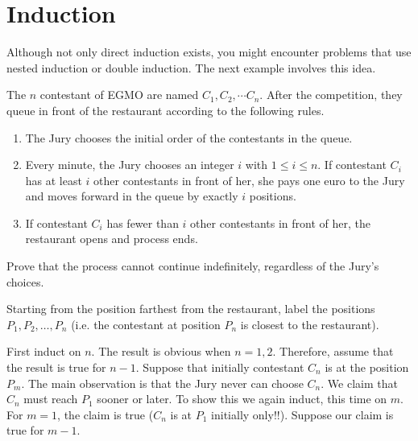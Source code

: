 \begin{example}

\end{example}

\section{Induction}

\begin{example}

\end{example}

Although not only direct induction exists, you might encounter problems that use nested induction or double induction. The next example involves this idea.

\begin{example}[EGMO 2018]
    The $n$ contestant of EGMO are named $C_1, C_2, \cdots C_n$. After the competition, they queue in front of the restaurant according to the following rules.
    \begin{enumerate}
        \item The Jury chooses the initial order of the contestants in the queue.
        \item Every minute, the Jury chooses an integer $i$ with $1 \leq i \leq n$.
        If contestant $C_i$ has at least $i$ other contestants in front of her, she pays one euro to the Jury and moves forward in the queue by exactly $i$ positions.
        \item If contestant $C_i$ has fewer than $i$ other contestants in front of her, the restaurant opens and process ends.
    \end{enumerate}
    Prove that the process cannot continue indefinitely, regardless of the Jury’s choices.
\end{example}

\sol Starting from the position farthest from the restaurant, label the positions $P_1,P_2, \dots ,P_n$ (i.e. the contestant at position $P_n$ is closest to the restaurant).

First induct on $n$. The result is obvious when $n=1,2$. Therefore, assume that the result is true for $n-1$. Suppose that initially contestant $C_n$ is at the position $P_m$. The main observation is that the Jury never can choose $C_n$. We claim that $C_n$ must reach $P_1$ sooner or later. To show this we again induct, this time on $m$. For $m=1$, the claim is true ($C_n$ is at $P_1$ initially only!!). Suppose our claim is true for $m-1$.

